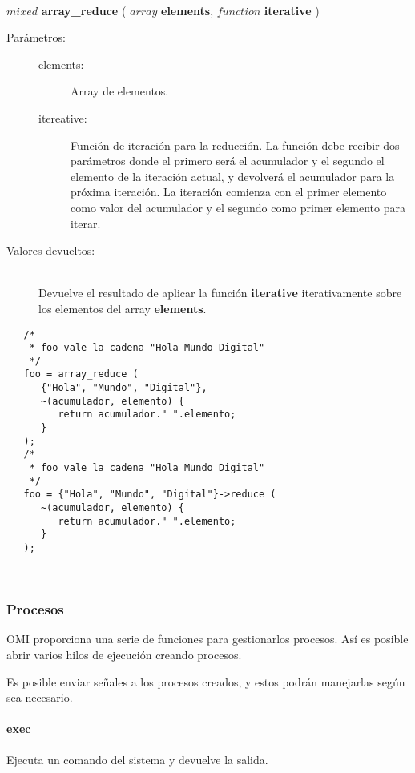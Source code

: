\hfill \\ $mixed$ \textbf{array\_reduce} ( $array$ \textbf{elements}, $function$ \textbf{iterative} )  
\begin{description}
\item [Parámetros:] \hfill 
   \begin{description}
   \item[elements:] Array de elementos.
   \item[itereative:] Función de iteración para la reducción. La función debe recibir dos parámetros donde el primero
   será el acumulador y el segundo el elemento de la iteración actual, y devolverá el acumulador para la próxima iteración.
   La iteración comienza con el primer elemento como valor del acumulador y el segundo como primer elemento para iterar.
   \end{description}
\item[Valores devueltos:] \hfill \\
   Devuelve el resultado de aplicar la función \textbf{iterative} iterativamente sobre los elementos del array \textbf{elements}.
\end{description}
     
\begin{lstlisting}   
   /*
    * foo vale la cadena "Hola Mundo Digital"
    */
   foo = array_reduce (
      {"Hola", "Mundo", "Digital"}, 
      ~(acumulador, elemento) { 
         return acumulador." ".elemento;
      }
   ); 
   /*
    * foo vale la cadena "Hola Mundo Digital"
    */
   foo = {"Hola", "Mundo", "Digital"}->reduce (
      ~(acumulador, elemento) { 
         return acumulador." ".elemento;
      }
   );
\end{lstlisting}
\hfill\\ 

\subsubsection{Procesos}
OMI proporciona una serie de funciones para gestionarlos procesos. Así es posible abrir varios
hilos de ejecución creando procesos.

Es posible enviar señales a los procesos creados, y estos podrán manejarlas según sea necesario. 

\paragraph{exec}
Ejecuta un comando del sistema y devuelve la salida.

